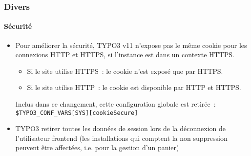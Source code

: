 %

\begin{frame}[fragile]
	\frametitle{Divers}
	\framesubtitle{Sécurité}

	\begin{itemize}
		\item Pour améliorer la sécurité, TYPO3 v11 n'expose pas le même cookie
			pour les connexions HTTP et HTTPS, si l'instance est dans un contexte HTTPS.

			\begin{itemize}
				\item Si le site utilise HTTPS~: le cookie n'est exposé que par HTTPS.
				\item Si le site utilise HTTP~: le cookie est disponible par HTTP et HTTPS.
			\end{itemize}

			Inclus dans ce changement, cette configuration globale est retirée~:
		 	\smaller\texttt{\$TYPO3\_CONF\_VARS[SYS][cookieSecure]}\normalsize

		\item TYPO3 retirer toutes les données de session lors de la déconnexion de l'utilisateur frontend\newline
			\small(les installations qui comptent la non suppression peuvent être affectées, i.e. pour la gestion d'un panier)\normalsize

	\end{itemize}

\end{frame}

